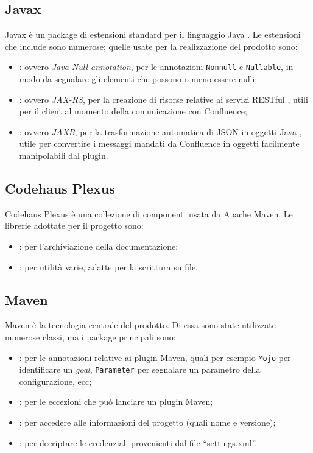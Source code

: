 \subsection{Javax}
Javax è un package di estensioni standard per il linguaggio Java \cite{site:javax}.
Le estensioni che include sono numerose; quelle usate per la realizzazione del prodotto sono:
\begin{itemize}
    \item {}: ovvero \emph{Java Null annotation}, per le annotazioni  \texttt{Nonnull} e  \texttt{Nullable}, in modo da segnalare gli elementi che possono o meno essere nulli;
    \item {}: ovvero \emph{JAX-RS}, per la creazione di risorse relative ai servizi RESTful \cite{site:jax-rs}, utili per il client al momento della comunicazione con Confluence;
    \item {}: ovvero \emph{JAXB}, per la trasformazione automatica di JSON in oggetti Java \cite{site:jaxb}, utile per convertire i messaggi mandati da Confluence in oggetti facilmente manipolabili dal plugin.
\end{itemize}


\subsection{Codehaus Plexus}
Codehaus Plexus è una collezione di componenti usata da Apache Maven.
Le librerie adottate per il progetto sono:
\begin{itemize}
    \item {}: per l'archiviazione della documentazione;
    \item {}: per utilità varie, adatte per la scrittura su file.
\end{itemize}


\subsection{Maven}
Maven è la tecnologia centrale del prodotto.
Di essa sono state utilizzate numerose classi, ma i package principali sono:
\begin{itemize}
    \item {}: per le annotazioni relative ai plugin Maven, quali per esempio \texttt{Mojo} per identificare un \emph{goal},  \texttt{Parameter} per segnalare un parametro della configurazione, ecc;
    \item {}: per le eccezioni che può lanciare un plugin Maven;
    \item {}: per accedere alle informazioni del progetto (quali nome e versione);
    \item {}: per decriptare le credenziali provenienti dal file ``settings.xml''.
\end{itemize}


